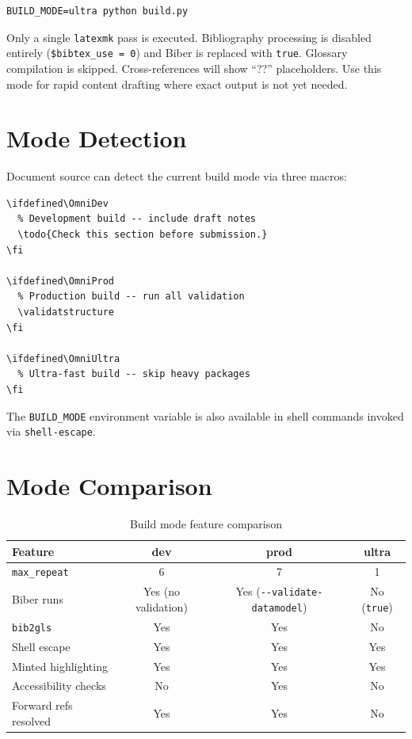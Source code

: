 \begin{verbatim}
BUILD_MODE=ultra python build.py
\end{verbatim}

Only a single \texttt{latexmk} pass is executed.  Bibliography processing
is disabled entirely (\texttt{\$bibtex\_use = 0}) and Biber is replaced
with \texttt{true}.  Glossary compilation is skipped.  Cross-references
will show ``??'' placeholders.  Use this mode for rapid content drafting
where exact output is not yet needed.

\section{Mode Detection}

Document source can detect the current build mode via three macros:

\begin{verbatim}
\ifdefined\OmniDev
  % Development build -- include draft notes
  \todo{Check this section before submission.}
\fi

\ifdefined\OmniProd
  % Production build -- run all validation
  \validatstructure
\fi

\ifdefined\OmniUltra
  % Ultra-fast build -- skip heavy packages
\fi
\end{verbatim}

The \texttt{BUILD\_MODE} environment variable is also available in shell
commands invoked via \texttt{shell-escape}.

\section{Mode Comparison}

\begin{table}[htbp]
  \centering
  \caption{Build mode feature comparison}
  \label{tab:build-modes}
  \begin{tabular}{lccc}
    \toprule
    \textbf{Feature}      & \textbf{dev} & \textbf{prod} & \textbf{ultra} \\
    \midrule
    \texttt{max\_repeat}  & 6            & 7              & 1              \\
    Biber runs             & Yes (no validation) & Yes (\texttt{-{}-validate-datamodel}) & No (\texttt{true}) \\
    \texttt{bib2gls}       & Yes          & Yes            & No             \\
    Shell escape           & Yes          & Yes            & Yes            \\
    Minted highlighting    & Yes          & Yes            & Yes            \\
    Accessibility checks   & No           & Yes            & No             \\
    Forward refs resolved  & Yes          & Yes            & No             \\
    \bottomrule
  \end{tabular}
\end{table}

